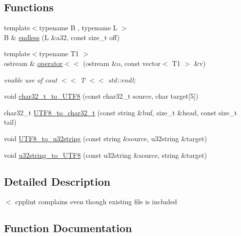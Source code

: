 \subsection*{Functions}
\begin{DoxyCompactItemize}
\item 
{\footnotesize template$<$typename B , typename L $>$ }\\B \& \hyperlink{namespacejlettvin_a22a95d44fbce8da6d460dbad5bddb41a}{endless} (L \&a32, const size\+\_\+t off)
\item 
\hypertarget{namespacejlettvin_ae776f6a66f5697c5cb2afb2c6efdbfd7}{}{\footnotesize template$<$typename T1 $>$ }\\ostream \& \hyperlink{namespacejlettvin_ae776f6a66f5697c5cb2afb2c6efdbfd7}{operator$<$$<$} (ostream \&o, const vector$<$ T1 $>$ \&v)\label{namespacejlettvin_ae776f6a66f5697c5cb2afb2c6efdbfd7}

\begin{DoxyCompactList}\small\item\em enable use of cout $<$$<$ T $<$$<$ std\+::endl; \end{DoxyCompactList}\item 
void \hyperlink{namespacejlettvin_a9aaf096d1b46552fd035d7886dd888c2}{char32\+\_\+t\+\_\+to\+\_\+\+U\+T\+F8} (const char32\+\_\+t source, char target\mbox{[}5\mbox{]})
\item 
char32\+\_\+t \hyperlink{namespacejlettvin_a7daeb72fd65e79c5906c485000416058}{U\+T\+F8\+\_\+to\+\_\+char32\+\_\+t} (const string \&buf, size\+\_\+t \&head, const size\+\_\+t tail)
\item 
void \hyperlink{namespacejlettvin_a431335096054ddc3a7b2e9132e068e53}{U\+T\+F8\+\_\+to\+\_\+u32string} (const string \&source, u32string \&target)
\item 
void \hyperlink{namespacejlettvin_a0f05981382a343493790771667e1f0af}{u32string\+\_\+to\+\_\+\+U\+T\+F8} (const u32string \&source, string \&target)
\end{DoxyCompactItemize}


\subsection{Detailed Description}
$<$ cpplint complains even though existing file is included 

\subsection{Function Documentation}
\hypertarget{namespacejlettvin_a9aaf096d1b46552fd035d7886dd888c2}{}
